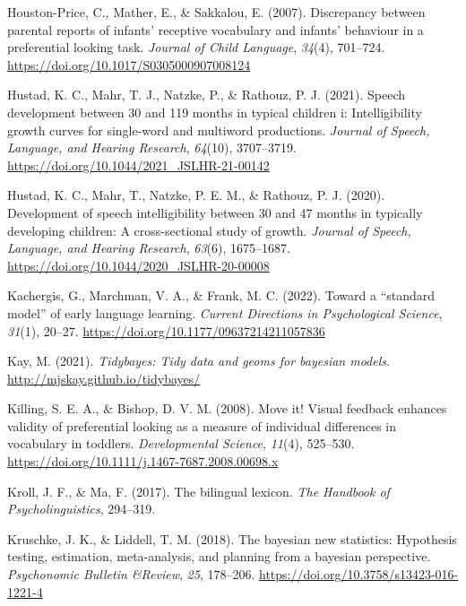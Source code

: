 \documentclass[
]{article}
\newlength{\cslhangindent}
\newlength{\cslentryspacingunit} %
\newenvironment{CSLReferences}[2] %
 {%
  \setlength{\parindent}{0pt}
  \ifodd #1
  \let\oldpar\par
  \def\par{\hangindent=\cslhangindent\oldpar}
  \fi
  \setlength{\parskip}{#2\cslentryspacingunit}
 }%
 {}
\begin{document}
\begin{CSLReferences}{1}{0}
\leavevmode{}%
Houston-Price, C., Mather, E., \& Sakkalou, E. (2007). Discrepancy
between parental reports of infants' receptive vocabulary and infants'
behaviour in a preferential looking task. \emph{Journal of Child
Language}, \emph{34}(4), 701--724.
\url{https://doi.org/10.1017/S0305000907008124}

\leavevmode{}%
Hustad, K. C., Mahr, T. J., Natzke, P., \& Rathouz, P. J. (2021). Speech
development between 30 and 119 months in typical children i:
Intelligibility growth curves for single-word and multiword productions.
\emph{Journal of Speech, Language, and Hearing Research}, \emph{64}(10),
3707--3719. \url{https://doi.org/10.1044/2021_JSLHR-21-00142}

\leavevmode{}%
Hustad, K. C., Mahr, T., Natzke, P. E. M., \& Rathouz, P. J. (2020).
Development of speech intelligibility between 30 and 47 months in
typically developing children: A cross-sectional study of growth.
\emph{Journal of Speech, Language, and Hearing Research}, \emph{63}(6),
1675--1687. \url{https://doi.org/10.1044/2020_JSLHR-20-00008}

\leavevmode{}%
Kachergis, G., Marchman, V. A., \& Frank, M. C. (2022). Toward a
{``standard model''} of early language learning. \emph{Current
Directions in Psychological Science}, \emph{31}(1), 20--27.
\url{https://doi.org/10.1177/09637214211057836}

\leavevmode{}%
Kay, M. (2021). \emph{Tidybayes: Tidy data and geoms for bayesian
models}. \url{http://mjskay.github.io/tidybayes/}

\leavevmode{}%
Killing, S. E. A., \& Bishop, D. V. M. (2008). Move it! Visual feedback
enhances validity of preferential looking as a measure of individual
differences in vocabulary in toddlers. \emph{Developmental Science},
\emph{11}(4), 525--530.
\url{https://doi.org/10.1111/j.1467-7687.2008.00698.x}

\leavevmode{}%
Kroll, J. F., \& Ma, F. (2017). The bilingual lexicon. \emph{The
Handbook of Psycholinguistics}, 294--319.

\leavevmode{}%
Kruschke, J. K., \& Liddell, T. M. (2018). The bayesian new statistics:
Hypothesis testing, estimation, meta-analysis, and planning from a
bayesian perspective. \emph{Psychonomic Bulletin \&Review}, \emph{25},
178--206. \url{https://doi.org/10.3758/s13423-016-1221-4}


\end{CSLReferences}
\end{document}
